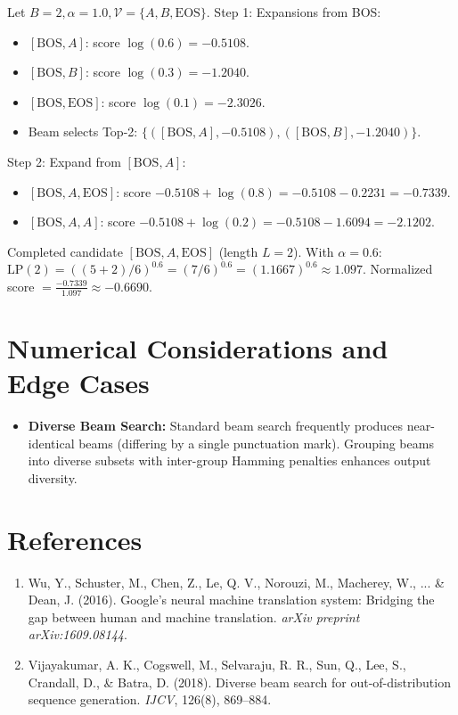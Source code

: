 \documentclass[11pt,a4paper]{article}
\theoremstyle{definition}
\begin{document}
Let $B=2, \alpha = 1.0, \mathcal{V} = \{A, B, \text{EOS}\}$.
Step 1: Expansions from BOS:
\begin{itemize}
    \item $[\text{BOS}, A]$: score $\log(0.6) = -0.5108$.
    \item $[\text{BOS}, B]$: score $\log(0.3) = -1.2040$.
    \item $[\text{BOS}, \text{EOS}]$: score $\log(0.1) = -2.3026$.
    \item Beam selects Top-2: $\{([\text{BOS}, A], -0.5108), ([\text{BOS}, B], -1.2040)\}$.
\end{itemize}
Step 2: Expand from $[\text{BOS}, A]$:
\begin{itemize}
    \item $[\text{BOS}, A, \text{EOS}]$: score $-0.5108 + \log(0.8) = -0.5108 - 0.2231 = -0.7339$.
    \item $[\text{BOS}, A, A]$: score $-0.5108 + \log(0.2) = -0.5108 - 1.6094 = -2.1202$.
\end{itemize}
Completed candidate $[\text{BOS}, A, \text{EOS}]$ (length $L=2$).
With $\alpha = 0.6$: $\text{LP}(2) = ((5+2)/6)^{0.6} = (7/6)^{0.6} = (1.1667)^{0.6} \approx 1.097$.
Normalized score $= \frac{-0.7339}{1.097} \approx -0.6690$.

\section{Numerical Considerations and Edge Cases}

\begin{itemize}
    \item \textbf{Diverse Beam Search:} Standard beam search frequently produces near-identical beams (differing by a single punctuation mark). Grouping beams into diverse subsets with inter-group Hamming penalties enhances output diversity.
\end{itemize}

\section{References}
\begin{enumerate}
    \item Wu, Y., Schuster, M., Chen, Z., Le, Q. V., Norouzi, M., Macherey, W., ... \& Dean, J. (2016). Google's neural machine translation system: Bridging the gap between human and machine translation. \emph{arXiv preprint arXiv:1609.08144}.
    \item Vijayakumar, A. K., Cogswell, M., Selvaraju, R. R., Sun, Q., Lee, S., Crandall, D., \& Batra, D. (2018). Diverse beam search for out-of-distribution sequence generation. \emph{IJCV}, 126(8), 869--884.
\end{enumerate}
\end{document}
